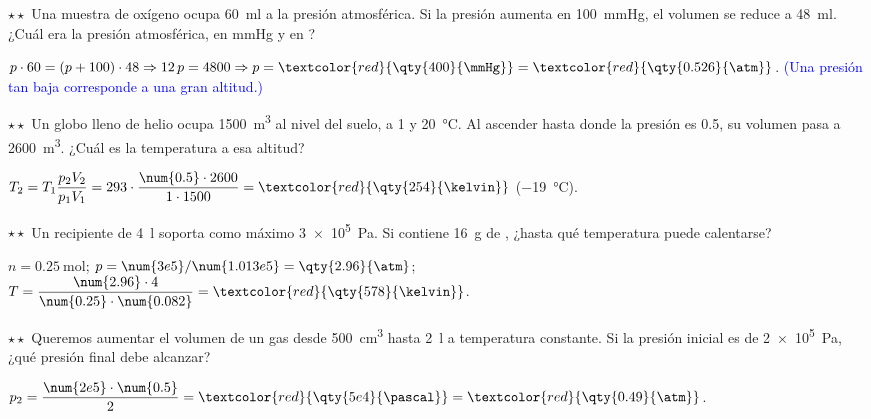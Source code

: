 \begin{exercise}
    \(\star\star\) Una muestra de oxígeno ocupa \qty{60}{\milli\litre} a la presión atmosférica. Si la presión aumenta en
    \qty{100}{\mmHg}, el volumen se reduce a \qty{48}{\milli\litre}. ¿Cuál era la presión atmosférica, en \unit{\mmHg} y en \unit{\atm}?
    \begin{solu}
        \(p \cdot 60 = (p + 100) \cdot 48 \Rightarrow 12\,p = 4800 \Rightarrow p = \textcolor{red}{\qty{400}{\mmHg}} = \textcolor{red}{\qty{0.526}{\atm}}\).
        \textcolor{blue}{(Una presión tan baja corresponde a una gran altitud.)}
    \end{solu}
\end{exercise}

\begin{exercise}
    \(\star\star\) Un globo lleno de helio ocupa \qty{1500}{\cubic\metre} al nivel del suelo, a \qty{1}{\atm} y \qty{20}{\degreeCelsius}. Al
    ascender hasta donde la presión es \qty{0.5}{\atm}, su volumen pasa a \qty{2600}{\cubic\metre}. ¿Cuál es la temperatura a esa altitud?
    \begin{solu}
        \(T_2 = T_1 \dfrac{p_2 V_2}{p_1 V_1} = 293 \cdot \dfrac{\num{0.5} \cdot 2600}{1 \cdot 1500} = \textcolor{red}{\qty{254}{\kelvin}}\) (\qty{-19}{\degreeCelsius}).
    \end{solu}
\end{exercise}

\begin{exercise}
    \(\star\star\) Un recipiente de \qty{4}{\litre} soporta como máximo \qty{3e5}{\pascal}. Si contiene \qty{16}{\gram} de , ¿hasta qué
    temperatura puede calentarse?
    \begin{solu}
        \(n = \qty{0.25}{\mole}\); \(p = \num{3e5}/\num{1.013e5} = \qty{2.96}{\atm}\); \(T = \dfrac{\num{2.96} \cdot 4}{\num{0.25} \cdot \num{0.082}} =
        \textcolor{red}{\qty{578}{\kelvin}}\).
    \end{solu}
\end{exercise}

\begin{exercise}
    \(\star\star\) Queremos aumentar el volumen de un gas desde \qty{500}{\cubic\centi\metre} hasta \qty{2}{\litre} a temperatura constante. Si la
    presión inicial es de \qty{2e5}{\pascal}, ¿qué presión final debe alcanzar?
    \begin{solu}
        \(p_2 = \dfrac{\num{2e5} \cdot \num{0.5}}{2} = \textcolor{red}{\qty{5e4}{\pascal}} = \textcolor{red}{\qty{0.49}{\atm}}\).
    \end{solu}
\end{exercise}

